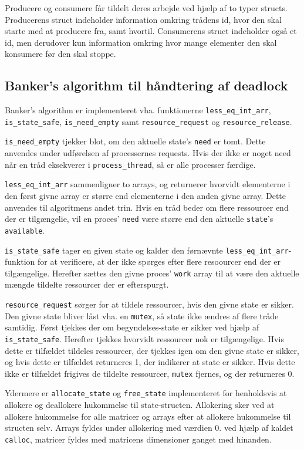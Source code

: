 Producere og consumere får tildelt deres arbejde ved hjælp af to typer structs. Producerens struct indeholder information omkring trådens id, hvor den skal starte med at producere fra, samt hvortil. Consumerens struct indeholder også et id, men derudover kun information omkring hvor mange elementer den skal konsumere før den skal stoppe.

\subsection{Banker's algorithm til håndtering af deadlock}
Banker's algorithm er implementeret vha. funktionerne \texttt{less\_eq\_int\_arr}, \texttt{is\_state\_safe}, \texttt{is\_need\_empty} samt \texttt{resource\_request} og \texttt{resource\_release}. 

\texttt{is\_need\_empty} tjekker blot, om den aktuelle state's \texttt{need} er tomt. Dette anvendes under udførelsen af processernes requests. Hvis der ikke er noget need når en tråd eksekverer i \texttt{process\_thread}, så er alle processer færdige.   

\texttt{less\_eq\_int\_arr} sammenligner to arrays, og returnerer hvorvidt elementerne i den først givne array er større end elementerne i den anden givne array. Dette anvendes til algoritmens andet trin. Hvis en tråd beder om flere ressourcer end der er tilgængelie, vil en proces' \texttt{need} være større end den aktuelle \texttt{state}'s \texttt{available}.

\texttt{is\_state\_safe} tager en given state og kalder den førnævnte \texttt{less\_eq\_int\_arr}-funktion for at verificere, at der ikke spørges efter flere resoourcer end der er tilgængelige. Herefter sættes den givne proces' \texttt{work} array til at være den aktuelle mængde tildelte ressourcer der er efterspurgt. 

\texttt{resource\_request} sørger for at tildele ressourcer, hvis den givne state er sikker. Den givne state bliver låst vha. en \texttt{mutex}, så state ikke ændres af flere tråde samtidig.  
Først tjekkes der om begyndelses-state er sikker ved hjælp af \texttt{is\_state\_safe}. Herefter tjekkes hvorvidt ressourcer nok er tilgængelige. Hvis dette er tilfældet tildeles ressourcer, der tjekkes igen om den givne state er sikker, og hvis dette er tilfældet returneres 1, der indikerer at state er sikker. Hvis dette ikke er tilfældet frigives de tildelte ressourcer, \texttt{mutex} fjernes, og der returneres 0.

Ydermere er \texttt{allocate\_state} og \texttt{free\_state} implementeret for henholdsvis at allokere og deallokere hukommelse til state-structen. Allokering sker ved at allokere hukommelse for alle matricer og arrays efter at allokere hukommelse til structen selv. Arrays fyldes under allokering med værdien 0. ved hjælp af kaldet \texttt{calloc}, matricer fyldes med matricens dimensioner ganget med hinanden.